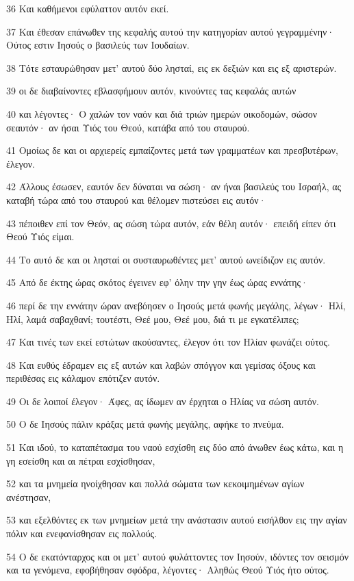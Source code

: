 \par 36 Και καθήμενοι εφύλαττον αυτόν εκεί.
\par 37 Και έθεσαν επάνωθεν της κεφαλής αυτού την κατηγορίαν αυτού γεγραμμένην· Ούτος εστιν Ιησούς ο βασιλεύς των Ιουδαίων.
\par 38 Τότε εσταυρώθησαν μετ' αυτού δύο λησταί, εις εκ δεξιών και εις εξ αριστερών.
\par 39 οι δε διαβαίνοντες εβλασφήμουν αυτόν, κινούντες τας κεφαλάς αυτών
\par 40 και λέγοντες· Ο χαλών τον ναόν και διά τριών ημερών οικοδομών, σώσον σεαυτόν· αν ήσαι Υιός του Θεού, κατάβα από του σταυρού.
\par 41 Ομοίως δε και οι αρχιερείς εμπαίζοντες μετά των γραμματέων και πρεσβυτέρων, έλεγον.
\par 42 Άλλους έσωσεν, εαυτόν δεν δύναται να σώση· αν ήναι βασιλεύς του Ισραήλ, ας καταβή τώρα από του σταυρού και θέλομεν πιστεύσει εις αυτόν·
\par 43 πέποιθεν επί τον Θεόν, ας σώση τώρα αυτόν, εάν θέλη αυτόν· επειδή είπεν ότι Θεού Υιός είμαι.
\par 44 Το αυτό δε και οι λησταί οι συσταυρωθέντες μετ' αυτού ωνείδιζον εις αυτόν.
\par 45 Από δε έκτης ώρας σκότος έγεινεν εφ' όλην την γην έως ώρας εννάτης·
\par 46 περί δε την εννάτην ώραν ανεβόησεν ο Ιησούς μετά φωνής μεγάλης, λέγων· Ηλί, Ηλί, λαμά σαβαχθανί; τουτέστι, Θεέ μου, Θεέ μου, διά τι με εγκατέλιπες;
\par 47 Και τινές των εκεί εστώτων ακούσαντες, έλεγον ότι τον Ηλίαν φωνάζει ούτος.
\par 48 Και ευθύς έδραμεν εις εξ αυτών και λαβών σπόγγον και γεμίσας όξους και περιθέσας εις κάλαμον επότιζεν αυτόν.
\par 49 Οι δε λοιποί έλεγον· Άφες, ας ίδωμεν αν έρχηται ο Ηλίας να σώση αυτόν.
\par 50 Ο δε Ιησούς πάλιν κράξας μετά φωνής μεγάλης, αφήκε το πνεύμα.
\par 51 Και ιδού, το καταπέτασμα του ναού εσχίσθη εις δύο από άνωθεν έως κάτω, και η γη εσείσθη και αι πέτραι εσχίσθησαν,
\par 52 και τα μνημεία ηνοίχθησαν και πολλά σώματα των κεκοιμημένων αγίων ανέστησαν,
\par 53 και εξελθόντες εκ των μνημείων μετά την ανάστασιν αυτού εισήλθον εις την αγίαν πόλιν και ενεφανίσθησαν εις πολλούς.
\par 54 Ο δε εκατόνταρχος και οι μετ' αυτού φυλάττοντες τον Ιησούν, ιδόντες τον σεισμόν και τα γενόμενα, εφοβήθησαν σφόδρα, λέγοντες· Αληθώς Θεού Υιός ήτο ούτος.
